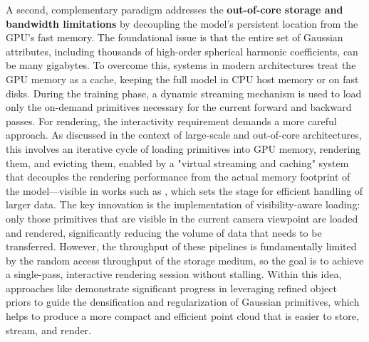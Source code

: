 \documentclass[11pt,a4paper]{article}
\begin{document}
A second, complementary paradigm addresses the \textbf{out-of-core storage and bandwidth limitations} by decoupling the model's persistent location from the GPU's fast memory. The foundational issue is that the entire set of Gaussian attributes, including thousands of high-order spherical harmonic coefficients, can be many gigabytes. To overcome this, systems in modern architectures treat the GPU memory as a cache, keeping the full model in CPU host memory or on fast disks. During the training phase, a dynamic streaming mechanism is used to load only the on-demand primitives necessary for the current forward and backward passes. For rendering, the interactivity requirement demands a more careful approach. As discussed in the context of large-scale and out-of-core architectures, this involves an iterative cycle of loading primitives into GPU memory, rendering them, and evicting them, enabled by a "virtual streaming and caching" system that decouples the rendering performance from the actual memory footprint of the model---visible in works such as \cite{arxiv:2507.15300v3}, which sets the stage for efficient handling of larger data. The key innovation is the implementation of visibility-aware loading: only those primitives that are visible in the current camera viewpoint are loaded and rendered, significantly reducing the volume of data that needs to be transferred. However, the throughput of these pipelines is fundamentally limited by the random access throughput of the storage medium, so the goal is to achieve a single-pass, interactive rendering session without stalling. Within this idea, approaches like \cite{arxiv:2506.02751v3} demonstrate significant progress in leveraging refined object priors to guide the densification and regularization of Gaussian primitives, which helps to produce a more compact and efficient point cloud that is easier to store, stream, and render.
\end{document}
